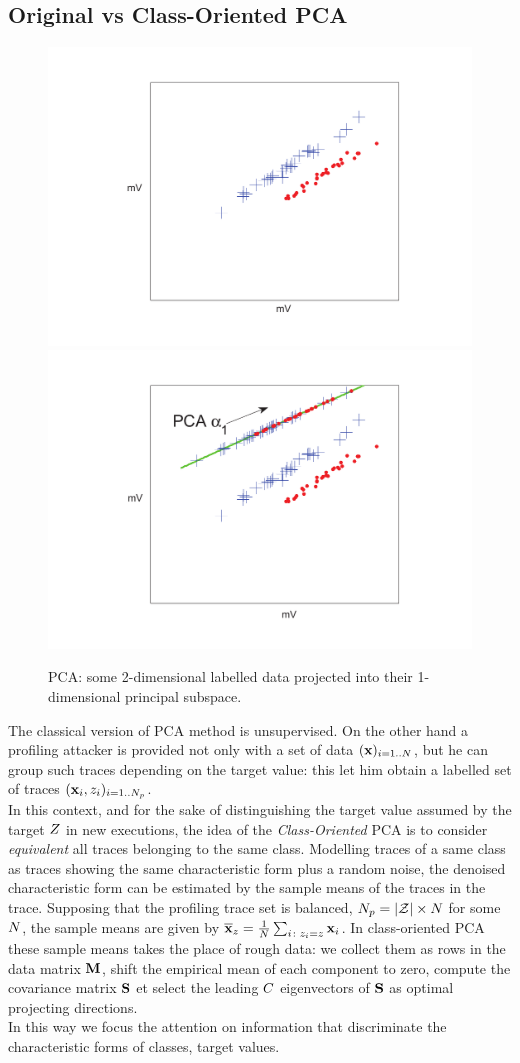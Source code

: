 \subsection{Original vs Class-Oriented PCA}
\begin{figure}
\includegraphics[width=.5\textwidth]{../Figures/PCA_LDA_geometric/dataNoProjection_mV2.pdf} 
\includegraphics[width=.5\textwidth]{../Figures/PCA_LDA_geometric/PCAprojection_mV2.pdf} 
\caption{PCA: some 2-dimensional labelled data projected into their 1-dimensional principal subspace.}\label{fig:PCAunsupervised_lab}
\end{figure}
The classical version of PCA method is unsupervised.
On the other hand a profiling attacker is provided not only with a set of data $(\textbf{x})_{i=1..N}$, but he can group such traces depending on the target value: this let him obtain a labelled set of traces $(\textbf{x}_i, z_i)_{i=1..N_p}$. \\
In this context, and for the sake of distinguishing the target value assumed by the target $Z$ in new executions, the idea of the {\em Class-Oriented} PCA is to consider {\em equivalent} all traces belonging to the same class. Modelling traces of a same class as traces showing the same characteristic form plus a random noise, the denoised characteristic form can be estimated by the sample means of the traces in the trace. Supposing that the profiling trace set is balanced, \ie $N_p = \lvert\mathcal{Z}\rvert \times N$ for some $N$, the sample means are given by $\overline{\textbf{x}}_{z} = \frac{1}{N}\sum_{i\colon z_i=z} \textbf{x}_i$. In class-oriented PCA these sample means takes the place of rough data: we collect them as rows in the data matrix $\textbf{M}$, shift the empirical mean of each component to zero, compute the covariance matrix $\textbf{S}$ et select the leading $C$ eigenvectors of $\textbf{S}$ as optimal projecting directions.\\
In this way we focus the attention on information that discriminate the characteristic forms of classes, \ie target values. 

